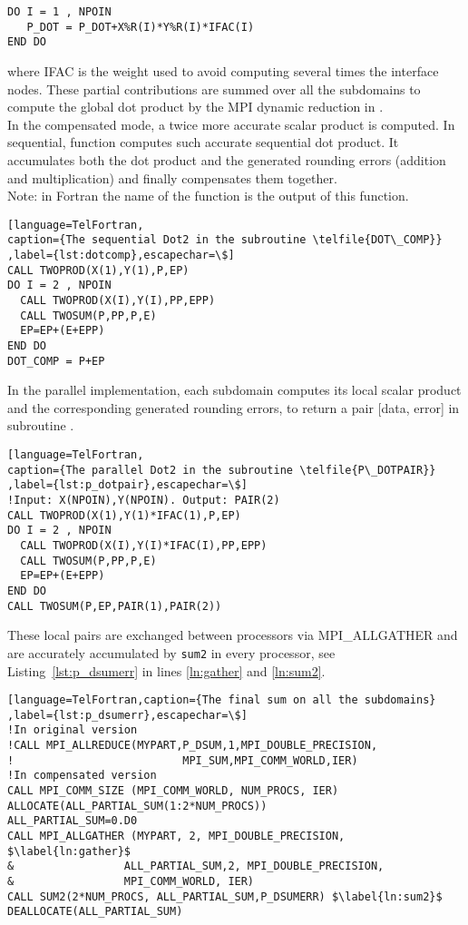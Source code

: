 \begin{lstlisting}[language=TelFortran,numbers=none,frame=none,escapechar=\$]
DO I = 1 , NPOIN
   P_DOT = P_DOT+X%R(I)*Y%R(I)*IFAC(I)
END DO
\end{lstlisting}
%
where IFAC is the weight used to avoid computing several times the interface nodes.
These partial contributions are summed over all the subdomains to compute
the global dot product by the MPI dynamic reduction in .\\
%
In the compensated mode, a twice more accurate scalar product is
computed.
In sequential, function  computes such
accurate sequential dot product.
It accumulates both the dot product and the generated rounding
errors (addition and multiplication) and finally compensates them together. \\
Note: in Fortran the name of the function is the
output of this function.
\begin{lstlisting}[language=TelFortran,
caption={The sequential Dot2 in the subroutine \telfile{DOT\_COMP}}
,label={lst:dotcomp},escapechar=\$]
CALL TWOPROD(X(1),Y(1),P,EP)
DO I = 2 , NPOIN
  CALL TWOPROD(X(I),Y(I),PP,EPP)
  CALL TWOSUM(P,PP,P,E)
  EP=EP+(E+EPP)
END DO
DOT_COMP = P+EP
\end{lstlisting}
%
In the parallel implementation, each subdomain computes its
local scalar product and the corresponding generated rounding
errors, to return a pair [data, error] in subroutine .
%
\begin{lstlisting}[language=TelFortran,
caption={The parallel Dot2 in the subroutine \telfile{P\_DOTPAIR}}
,label={lst:p_dotpair},escapechar=\$]
!Input: X(NPOIN),Y(NPOIN). Output: PAIR(2)
CALL TWOPROD(X(1),Y(1)*IFAC(1),P,EP)
DO I = 2 , NPOIN
  CALL TWOPROD(X(I),Y(I)*IFAC(I),PP,EPP)
  CALL TWOSUM(P,PP,P,E)
  EP=EP+(E+EPP)
END DO
CALL TWOSUM(P,EP,PAIR(1),PAIR(2))
\end{lstlisting}
%
These local pairs are exchanged between processors
via MPI\_ALLGATHER and are accurately accumulated by \texttt{sum2}
in every processor, see Listing~\ref{lst:p_dsumerr} in lines
\ref{ln:gather} and \ref{ln:sum2}.
%
\begin{lstlisting}[language=TelFortran,caption={The final sum on all the subdomains}
,label={lst:p_dsumerr},escapechar=\$]
!In original version
!CALL MPI_ALLREDUCE(MYPART,P_DSUM,1,MPI_DOUBLE_PRECISION,
!                          MPI_SUM,MPI_COMM_WORLD,IER)
!In compensated version
CALL MPI_COMM_SIZE (MPI_COMM_WORLD, NUM_PROCS, IER)
ALLOCATE(ALL_PARTIAL_SUM(1:2*NUM_PROCS))
ALL_PARTIAL_SUM=0.D0
CALL MPI_ALLGATHER (MYPART, 2, MPI_DOUBLE_PRECISION, $\label{ln:gather}$
&                 ALL_PARTIAL_SUM,2, MPI_DOUBLE_PRECISION,
&                 MPI_COMM_WORLD, IER)
CALL SUM2(2*NUM_PROCS, ALL_PARTIAL_SUM,P_DSUMERR) $\label{ln:sum2}$
DEALLOCATE(ALL_PARTIAL_SUM)
\end{lstlisting}
